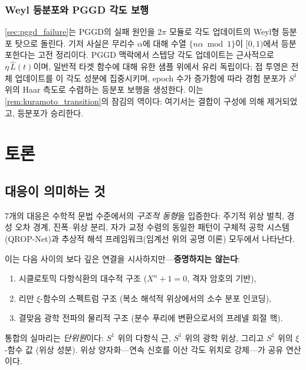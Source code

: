 \documentclass[11pt, a4paper]{article}
\theoremstyle{definition}
\theoremstyle{plain}
\newcommand{\xif}{\xi}
\begin{document}
\subsubsection{Weyl 등분포와 PGGD 각도 보행}
\label{sec:weyl}

\cref{sec:pggd_failure}는 PGGD의 실패 원인을 $2\pi$ 모듈로 각도 업데이트의 Weyl형 등분포 탓으로 돌린다. 기저 사실은 무리수 $\alpha$에 대해 수열 $\{n\alpha\bmod 1\}$이 $[0,1)$에서 등분포한다는 고전 정리이다. PGGD 맥락에서 스텝당 각도 업데이트는 근사적으로 $\eta\,\hat L(t)$이며, 일반적 타겟 함수에 대해 유한 샘플 위에서 유리 독립이다; 접 투영은 전체 업데이트를 이 각도 성분에 집중시키며, epoch 수가 증가함에 따라 경험 분포가 $S^1$ 위의 Haar 측도로 수렴하는 등분포 보행을 생성한다. 이는 \cref{rem:kuramoto_transition}의 잠김의 역이다: 여기서는 결합이 구성에 의해 제거되었고, 등분포가 승리한다.


\section{토론}
\label{sec:discussion}

\subsection{대응이 의미하는 것}

7개의 대응은 수학적 문법 수준에서의 \textit{구조적 동형}을 입증한다: 주기적 위상 벌칙, 경성 오차 경계, 진폭--위상 분리, 자가 교정 수렴의 동일한 패턴이 구체적 공학 시스템(QROP-Net)과 추상적 해석 프레임워크(임계선 위의 공명 이론) 모두에서 나타난다.

이는 다음 사이의 보다 깊은 연결을 시사하지만---\textbf{증명하지는 않는다}:
\begin{enumerate}
  \item 시클로토믹 다항식환의 대수적 구조 ($X^n + 1 = 0$, 격자 암호의 기반),
  \item 리만 $\xif$-함수의 스펙트럼 구조 (복소 해석적 위상에서의 소수 분포 인코딩),
  \item 결맞음 광학 전파의 물리적 구조 (분수 푸리에 변환으로서의 프레넬 회절 핵).
\end{enumerate}

통합의 실마리는 \textit{단위원}이다: $S^1$ 위의 다항식 근, $S^1$ 위의 광학 위상, 그리고 $S^1$ 위의 $\xif$-함수 값 (위상 성분). 위상 양자화---연속 신호를 이산 각도 위치로 강제---가 공유 연산이다.
\end{document}
